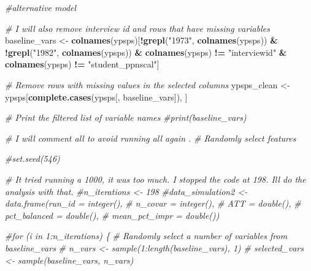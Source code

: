 \documentclass[
]{article}
\newenvironment{Shaded}{\begin{snugshade}}{\end{snugshade}}
\newcommand{\CommentTok}[1]{\textcolor[rgb]{0.56,0.35,0.01}{\textit{#1}}}
\newcommand{\FunctionTok}[1]{\textcolor[rgb]{0.13,0.29,0.53}{\textbf{#1}}}
\newcommand{\NormalTok}[1]{#1}
\newcommand{\OtherTok}[1]{\textcolor[rgb]{0.56,0.35,0.01}{#1}}
\newcommand{\SpecialCharTok}[1]{\textcolor[rgb]{0.81,0.36,0.00}{\textbf{#1}}}
\newcommand{\StringTok}[1]{\textcolor[rgb]{0.31,0.60,0.02}{#1}}
\begin{document}
\begin{Shaded}
\begin{Highlighting}[]
\CommentTok{\#alternative model }

\CommentTok{\# I will also remove interview id and rows that have missing variables }
\NormalTok{baseline\_vars }\OtherTok{\textless{}{-}} \FunctionTok{colnames}\NormalTok{(ypsps)[}\SpecialCharTok{!}\FunctionTok{grepl}\NormalTok{(}\StringTok{"1973"}\NormalTok{, }\FunctionTok{colnames}\NormalTok{(ypsps)) }\SpecialCharTok{\&}
                                 \SpecialCharTok{!}\FunctionTok{grepl}\NormalTok{(}\StringTok{"1982"}\NormalTok{, }\FunctionTok{colnames}\NormalTok{(ypsps)) }\SpecialCharTok{\&}
                                 \FunctionTok{colnames}\NormalTok{(ypsps) }\SpecialCharTok{!=} \StringTok{"interviewid"} \SpecialCharTok{\&}
                                 \FunctionTok{colnames}\NormalTok{(ypsps) }\SpecialCharTok{!=} \StringTok{"student\_ppnscal"}\NormalTok{]}

\CommentTok{\# Remove rows with missing values in the selected columns}
\NormalTok{ypsps\_clean }\OtherTok{\textless{}{-}}\NormalTok{ ypsps[}\FunctionTok{complete.cases}\NormalTok{(ypsps[, baseline\_vars]), ]}


\CommentTok{\# Print the filtered list of variable names}
\CommentTok{\#print(baseline\_vars)}

\CommentTok{\# I will comment all to avoid running all again . }
\CommentTok{\# Randomly select features}

\CommentTok{\#set.seed(546)  }

\CommentTok{\# It tried running a 1000, it was too much. I stopped the code at 198. Ill do the analysis with that. }
\CommentTok{\#n\_iterations \textless{}{-} 198}
\CommentTok{\#data\_simulation2 \textless{}{-} data.frame(run\_id = integer(),}
                        \CommentTok{\#      n\_covar = integer(),}
                        \CommentTok{\#      ATT = double(),}
                        \CommentTok{\#      pct\_balanced = double(),}
                         \CommentTok{\#     mean\_pct\_impr = double())}



\CommentTok{\#for (i in 1:n\_iterations) \{}
  \CommentTok{\# Randomly select a number of variables from baseline\_vars}
 \CommentTok{\# n\_vars \textless{}{-} sample(1:length(baseline\_vars), 1)}
 \CommentTok{\# selected\_vars \textless{}{-} sample(baseline\_vars, n\_vars)}


\end{Highlighting}
\end{Shaded}
\end{document}
